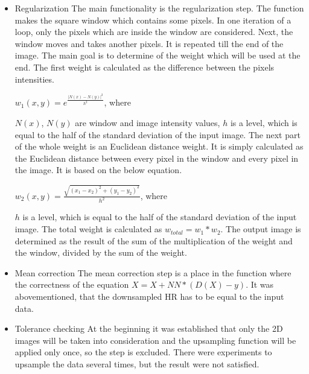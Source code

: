 \begin{itemize}
\item Regularization
\newline The main functionality is the regularization step. The function makes the square window which contains some pixels. In one iteration of a loop, only the pixels which are inside the window are considered. Next, the window moves and takes another pixels. It is repeated till the end of the image. The main goal is to determine of the weight which will be used at the end.
\newline The first weight is calculated as the difference between the pixels intensities.
\newline 
\centerline {$w_{1}(x, y)= e^{\frac{|N(x)-N(y)|^{2}}{h^{2}}}$, where}
\newline
\newline $N(x)$, $N(y)$ are window and image intensity values,
\newline $h$ is a level, which is equal to the half of the standard deviation of the input image.
\newline The next part of the whole weight is an Euclidean distance weight. It is simply calculated as the Euclidean distance between every pixel in the window and every pixel in the image. It is based on the below equation.
\newline
\newline
\centerline{ $w_{2}(x,y)=\frac{\sqrt{(x_{1}-x_{2})^{2}+(y_{1}-y_{2})^{2}}}{h^{2}}$, where }
\newline
\newline $h$ is a level, which is equal to the half of the standard deviation of the input image.
\newline The total weight is calculated as $w_{total}=w_{1}*w_{2}$. The output image is determined as the result of the sum of the multiplication of the weight and the window, divided by the sum of the weight.

\item Mean correction
\newline The mean correction step is a place in the function where the correctness of the equation $X=X+NN*(D(X)-y)$. It was abovementioned, that the downsampled HR has to be equal to the input data.

\item Tolerance checking
\newline At the beginning it was established that only the 2D images will be taken into consideration and the upsampling function will be applied only once, so the step is excluded. There were experiments to upsample the data several times, but the result were not satisfied.



\end{itemize}
